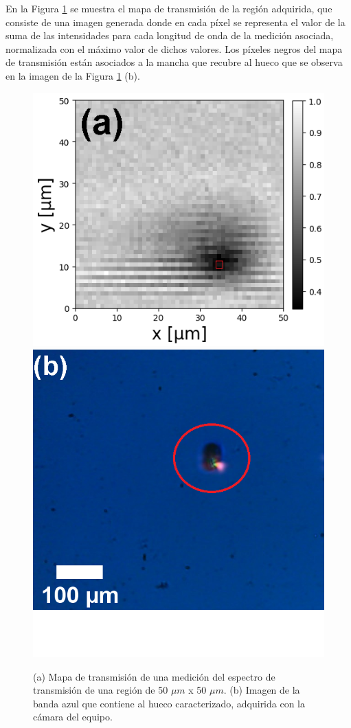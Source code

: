En la Figura \ref{fig:agujeroimg} se muestra el mapa de transmisión de la región adquirida, que consiste de una imagen generada donde en cada píxel se representa el valor de la suma de las intensidades para cada longitud de onda de la medición asociada, normalizada con el máximo valor de dichos valores. Los píxeles negros del mapa de transmisión están asociados a la mancha que recubre al hueco que se observa en la imagen de la Figura \ref{fig:agujeroimg} (b).
 \begin{figure}[H]
\hfill%
	\includegraphics[scale=1.0]{Figs/microespectrometro/tranhueco.png}
\hfill%
	\includegraphics[scale=0.6]{Figs/microespectrometro/imagujero.png}
	\hfill%
	\hfill%
	\caption{(a) Mapa de transmisión de una medición del espectro de transmisión de una región de 50 $\mu m$ x 50 $\mu m$. (b) Imagen de la banda azul que contiene al hueco caracterizado, adquirida con la cámara del equipo.}
	\label{fig:agujeroimg}
\end{figure}


